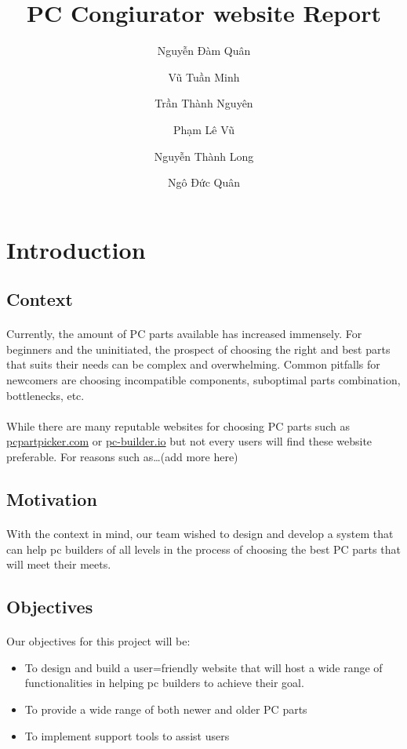 \documentclass[11pt, a4paper]{article}
\title{PC Congiurator website Report}
\author{
  \selectlanguage{vietnamese}
  Nguyễn Đàm Quân \and Vũ Tuần Minh \and Trần Thành Nguyên \and Phạm Lê Vũ \and Nguyễn Thành Long \and Ngô Đức Quân}
\begin{document}
\maketitle
\clearpage

\tableofcontents
\clearpage

\section{Introduction}
\subsection{Context}
\paragraph{} Currently, the amount of PC parts available has increased immensely. For beginners and the uninitiated, the prospect of choosing the right and best parts that suits their needs can be complex and overwhelming. Common pitfalls for newcomers are choosing incompatible components, suboptimal parts combination, bottlenecks, etc.

\paragraph{} While there are many reputable websites for choosing PC parts such as \href{https://pcpartpicker.com/}{pcpartpicker.com} or \href{https://pc-builder.io/}{pc-builder.io} but not every users will find these website preferable. For reasons such as\dots(add more here)

\subsection{Motivation}
\paragraph{} With the context in mind, our team wished to design and develop a system that can help pc builders of all levels in the process of choosing the best PC parts that will meet their meets.

\subsection{Objectives}
\paragraph{} Our objectives for this project will be: 
\begin{itemize}
  \item To design and build a user=friendly website that will host a wide range of functionalities in helping pc builders to achieve their goal.
  \item To provide a wide range of both newer and older PC parts
  \item To implement support tools to assist users
\end{itemize}
\end{document}
